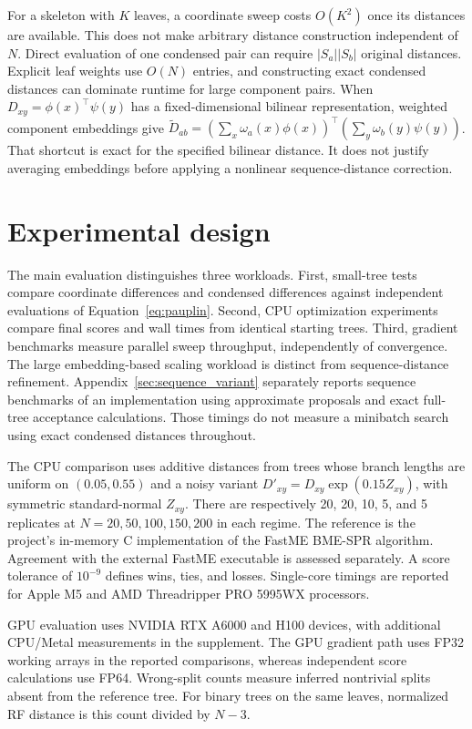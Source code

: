 \documentclass[11pt,a4paper]{article}
\makeatletter
\DeclareRobustCommand{\_}{\ifmmode\nfss@text{\textunderscore}\else\textunderscore\allowbreak\fi}
\theoremstyle{definition}
\makeatother
\begin{document}
For a skeleton with $K$ leaves, a coordinate sweep costs $O(K^2)$ once its distances are available.
This does not make arbitrary distance construction independent of $N$.
Direct evaluation of one condensed pair can require $|S_a||S_b|$ original distances.
Explicit leaf weights use $O(N)$ entries, and constructing exact condensed distances can dominate runtime for large component pairs.
When $D_{xy}=\phi(x)^\top\psi(y)$ has a fixed-dimensional bilinear representation, weighted component embeddings give
$\widetilde D_{ab}=(\sum_x\omega_a(x)\phi(x))^\top
(\sum_y\omega_b(y)\psi(y))$.
That shortcut is exact for the specified bilinear distance.
It does not justify averaging embeddings before applying a nonlinear sequence-distance correction.

\section{Experimental design}
\label{sec:experiments}

The main evaluation distinguishes three workloads.
First, small-tree tests compare coordinate differences and condensed differences against independent evaluations of Equation~\eqref{eq:pauplin}.
Second, CPU optimization experiments compare final scores and wall times from identical starting trees.
Third, gradient benchmarks measure parallel sweep throughput, independently of convergence.
The large embedding-based scaling workload is distinct from sequence-distance refinement.
Appendix~\ref{sec:sequence_variant} separately reports sequence benchmarks of an implementation using approximate proposals and exact full-tree acceptance calculations.
Those timings do not measure a minibatch search using exact condensed distances throughout.

The CPU comparison uses additive distances from trees whose branch lengths are uniform on $(0.05,0.55)$ and a noisy variant
$D'_{xy}=D_{xy}\exp(0.15Z_{xy})$, with symmetric standard-normal $Z_{xy}$.
There are respectively 20, 20, 10, 5, and 5 replicates at
$N=20,50,100,150,200$ in each regime.
The reference is the project's in-memory C implementation of the FastME BME-SPR algorithm.
Agreement with the external FastME executable is assessed separately.
A score tolerance of $10^{-9}$ defines wins, ties, and losses.
Single-core timings are reported for Apple M5 and AMD Threadripper PRO 5995WX processors.

GPU evaluation uses NVIDIA RTX A6000 and H100 devices, with additional CPU/Metal measurements in the supplement.
The GPU gradient path uses FP32 working arrays in the reported comparisons, whereas independent score calculations use FP64.
Wrong-split counts measure inferred nontrivial splits absent from the reference tree.
For binary trees on the same leaves, normalized RF distance is this count divided by $N-3$.
\end{document}
